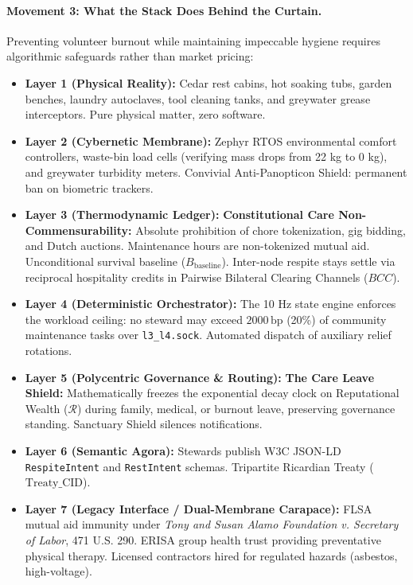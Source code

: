 \paragraph{Movement 3: What the Stack Does Behind the Curtain.}
Preventing volunteer burnout while maintaining impeccable hygiene requires algorithmic safeguards rather than market pricing:
\begin{itemize}
    \item \textbf{Layer 1 (Physical Reality):} Cedar rest cabins, hot soaking tubs, garden benches, laundry autoclaves, tool cleaning tanks, and greywater grease interceptors. Pure physical matter, zero software.
    \item \textbf{Layer 2 (Cybernetic Membrane):} Zephyr RTOS environmental comfort controllers, waste-bin load cells (verifying mass drops from 22 kg to 0 kg), and greywater turbidity meters. Convivial Anti-Panopticon Shield: permanent ban on biometric trackers.
    \item \textbf{Layer 3 (Thermodynamic Ledger):} \textbf{Constitutional Care Non-Commensurability:} Absolute prohibition of chore tokenization, gig bidding, and Dutch auctions. Maintenance hours are non-tokenized mutual aid. Unconditional survival baseline ($B_{\mathrm{baseline}}$). Inter-node respite stays settle via reciprocal hospitality credits in Pairwise Bilateral Clearing Channels ($BCC$).
    \item \textbf{Layer 4 (Deterministic Orchestrator):} The 10 Hz state engine enforces the workload ceiling: no steward may exceed $2000\,\mathrm{bp}$ (20\%) of community maintenance tasks over \texttt{l3\_l4.sock}. Automated dispatch of auxiliary relief rotations.
    \item \textbf{Layer 5 (Polycentric Governance \& Routing):} \textbf{The Care Leave Shield:} Mathematically freezes the exponential decay clock on Reputational Wealth ($\mathcal{R}$) during family, medical, or burnout leave, preserving governance standing. Sanctuary Shield silences notifications.
    \item \textbf{Layer 6 (Semantic Agora):} Stewards publish W3C JSON-LD \texttt{RespiteIntent} and \texttt{RestIntent} schemas. Tripartite Ricardian Treaty ($\mathrm{Treaty\_CID}$).
    \item \textbf{Layer 7 (Legacy Interface / Dual-Membrane Carapace):} FLSA mutual aid immunity under \textit{Tony and Susan Alamo Foundation v. Secretary of Labor}, 471 U.S. 290. ERISA group health trust providing preventative physical therapy. Licensed contractors hired for regulated hazards (asbestos, high-voltage).
\end{itemize}

